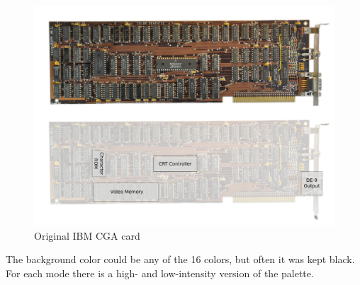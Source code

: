 \documentclass[book.tex]{subfiles}
\begin{document}
\begin{figure}[H]
  \centering 
  \includegraphics[width=1.3\textwidth, angle =90 ]{screenshots_300dpi/hardware/ibm_cga_card.png} 
  \caption{Original IBM CGA card}
  \label{fig:ibm_cga_card}
\end{figure}

The background color could be any of the 16 colors, but often it was kept black. For each mode there is a high- and low-intensity version of the palette.\\
\end{document}
